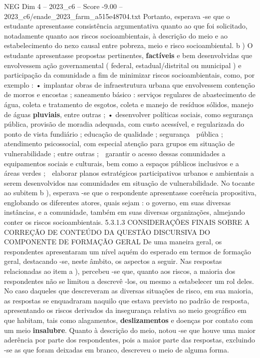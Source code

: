 \begin{textsample}{NEG Dim 4 – 2023\_c6 – Score -9.00 – 2023\_c6/enade\_2023\_farm\_a515e48704.txt}
Portanto, esperava -se que o estudante apresentasse consistência argumentativa quanto ao que foi solicitado, notadamente quanto aos riscos socioambientais, à descrição do meio e ao estabelecimento do nexo causal entre pobreza, meio e risco socioambiental. b ) O estudante apresentasse propostas pertinentes, \textbf{factíveis} e bem desenvolvidas que envolvessem ação governamental ( federal, estadual/distrital ou municipal ) e participação da comunidade a fim de minimizar riscos socioambientais, como, por exemplo : • implantar obras de infraestrutura urbana que envolvessem contenção de morros e encostas ; saneamento básico : serviços regulares de abastecimento de água, coleta e tratamento de esgotos, coleta e manejo de resíduos sólidos, manejo de águas \textbf{pluviais}, entre outras ; • desenvolver políticas sociais, como segurança pública, provisão de moradia adequada, com custo acessível, e regularizada do ponto de vista fundiário ; educação de qualidade ; segurança  pública ; atendimento psicossocial, com especial atenção para grupos em situação de vulnerabilidade ; entre outras ;  garantir o acesso dessas comunidades a equipamentos sociais e culturais, bem como a espaços públicos inclusivos e a áreas verdes ;  elaborar planos estratégicos participativos urbanos e ambientais a serem desenvolvidos nas comunidades em situação de vulnerabilidade.
No tocante ao subitem b ), esperava -se que o respondente apresentasse coerência propositiva, englobando os diferentes atores, quais sejam : o governo, em suas diversas instâncias, e a comunidade, também em suas diversas organizações, almejando conter os riscos socioambientais. 5.3.1.3 CONSIDERAÇÕES FINAIS SOBRE A CORREÇÃO DE CONTEÚDO DA QUESTÃO DISCURSIVA DO COMPONENTE DE FORMAÇÃO GERAL De uma maneira geral, os respondentes apresentaram um nível aquém do esperado em termos de formação geral, destacando -se, neste âmbito, os aspectos a seguir.
Nas respostas relacionadas ao item a ), percebeu -se que, quanto aos riscos, a maioria dos respondentes não se limitou a descrevê -los, ou mesmo a estabelecer um rol deles.
No caso daqueles que descreveram as diversas situações de risco, em sua maioria, as respostas se enquadraram naquilo que estava previsto no padrão de resposta, apresentando os riscos derivados da insegurança relativa ao meio geográfico em que habitam, tais como alagamentos, \textbf{deslizamentos} e doenças por contato com um meio \textbf{insalubre}.
Quanto à descrição do meio, notou -se que houve uma maior aderência por parte dos respondentes, pois a maior parte das respostas, excluindo -se as que foram deixadas em branco, descreveu o meio de alguma forma.

\end{textsample}
